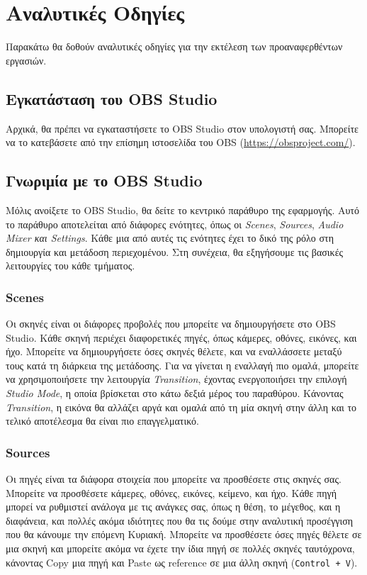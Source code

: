\documentclass[12pt,a4paper]{article}
\begin{document}
\section{Αναλυτικές Οδηγίες}
Παρακάτω θα δοθούν αναλυτικές οδηγίες για την εκτέλεση των προαναφερθέντων εργασιών.
\subsection{Εγκατάσταση του OBS Studio}
Αρχικά, θα πρέπει να εγκαταστήσετε το OBS Studio στον υπολογιστή σας.
Μπορείτε να το κατεβάσετε από την επίσημη ιστοσελίδα του OBS (\url{https://obsproject.com/}).
\subsection{Γνωριμία με το OBS Studio}
Μόλις ανοίξετε το OBS Studio, θα δείτε το κεντρικό παράθυρο της εφαρμογής. Αυτό το παράθυρο
αποτελείται από διάφορες ενότητες, όπως οι \textit{Scenes}, \textit{Sources}, \textit{Audio Mixer
  και \textit{Settings}}. Κάθε μια από αυτές τις ενότητες έχει το δικό της ρόλο στη δημιουργία
και μετάδοση περιεχομένου. Στη συνέχεια, θα εξηγήσουμε τις βασικές λειτουργίες του κάθε τμήματος.
\subsubsection{Scenes}
Οι σκηνές είναι οι διάφορες προβολές που μπορείτε να δημιουργήσετε στο OBS Studio. Κάθε σκηνή
περιέχει διαφορετικές πηγές, όπως κάμερες, οθόνες, εικόνες, και ήχο. Μπορείτε να δημιουργήσετε
όσες σκηνές θέλετε, και να εναλλάσσετε μεταξύ τους κατά τη διάρκεια της μετάδοσης. Για να
γίνεται η εναλλαγή πιο ομαλά, μπορείτε να χρησιμοποιήσετε την λειτουργία \textit{Transition},
έχοντας ενεργοποιήσει την επιλογή \textit{Studio Mode}, η οποία βρίσκεται στο κάτω δεξιά μέρος του παραθύρου. Κάνοντας
\textit{Transition}, η εικόνα θα αλλάζει αργά και ομαλά από τη μία σκηνή στην άλλη και το τελικό
αποτέλεσμα θα είναι πιο επαγγελματικό.
\subsubsection{Sources}
Οι πηγές είναι τα διάφορα στοιχεία που μπορείτε να προσθέσετε στις σκηνές σας. Μπορείτε να
προσθέσετε κάμερες, οθόνες, εικόνες, κείμενο, και ήχο. Κάθε πηγή μπορεί να ρυθμιστεί ανάλογα
με τις ανάγκες σας, όπως η θέση, το μέγεθος, και η διαφάνεια, και πολλές ακόμα ιδιότητες που θα τις
δούμε στην αναλυτική προσέγγιση που θα κάνουμε την επόμενη Κυριακή. Μπορείτε να προσθέσετε όσες πηγές θέλετε σε
μια σκηνή και μπορείτε ακόμα να έχετε την ίδια πηγή σε πολλές σκηνές ταυτόχρονα, κάνοντας Copy μια πηγή
και Paste ως reference σε μια άλλη σκηνή (\texttt{Control + V}).
\end{document}
